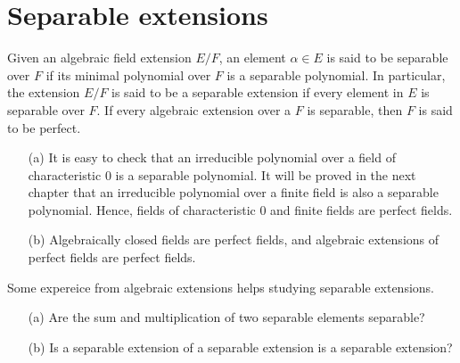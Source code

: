 \section{Separable extensions}

\begin{defi}[Separability]
    Given an algebraic field extension $E/F$, an element $\alpha\in E$ is said to be separable over $F$ if its minimal polynomial over $F$ is a separable polynomial.
    In particular, the extension $E/F$ is said to be a separable extension if every element in $E$ is separable over $F$.
    If every algebraic extension over a $F$ is separable, then $F$ is said to be perfect.
\end{defi}
\begin{exmp}
    \begin{enumerate}
        \item[(a)]
        {
            It is easy to check that an irreducible polynomial over a field of characteristic 0 is a separable polynomial.
            It will be proved in the next chapter that an irreducible polynomial over a finite field is also a separable polynomial.
            Hence, fields of characteristic 0 and finite fields are perfect fields.
        }
        \item[(b)]
        {
            Algebraically closed fields are perfect fields, and algebraic extensions of perfect fields are perfect fields.
        }
    \end{enumerate}
\end{exmp}

Some expereice from algebraic extensions helps studying separable extensions.
\begin{qst}\label{qst: separable extn}
    \begin{enumerate}
        \item[(a)]
        {
            Are the sum and multiplication of two separable elements separable?
        }
        \item[(b)]
        {
            Is a separable extension of a separable extension is a separable extension?
        }
    \end{enumerate}
\end{qst}

